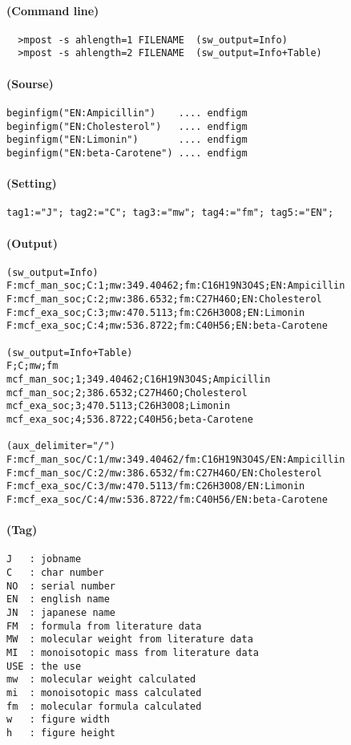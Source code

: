\documentclass[a4paper]{article}
\begin{document}
\paragraph{(Command line)}
\begin{verbatim}
  >mpost -s ahlength=1 FILENAME  (sw_output=Info)
  >mpost -s ahlength=2 FILENAME  (sw_output=Info+Table)
\end{verbatim}
\paragraph{(Sourse)}
\begin{verbatim}
beginfigm("EN:Ampicillin")    .... endfigm
beginfigm("EN:Cholesterol")   .... endfigm
beginfigm("EN:Limonin")       .... endfigm
beginfigm("EN:beta-Carotene") .... endfigm
\end{verbatim}
\paragraph{(Setting)}
\begin{verbatim}
tag1:="J"; tag2:="C"; tag3:="mw"; tag4:="fm"; tag5:="EN";
\end{verbatim}
\paragraph{(Output)}
%
\begin{verbatim}
(sw_output=Info)
F:mcf_man_soc;C:1;mw:349.40462;fm:C16H19N3O4S;EN:Ampicillin
F:mcf_man_soc;C:2;mw:386.6532;fm:C27H46O;EN:Cholesterol
F:mcf_exa_soc;C:3;mw:470.5113;fm:C26H30O8;EN:Limonin
F:mcf_exa_soc;C:4;mw:536.8722;fm:C40H56;EN:beta-Carotene

(sw_output=Info+Table)
F;C;mw;fm
mcf_man_soc;1;349.40462;C16H19N3O4S;Ampicillin
mcf_man_soc;2;386.6532;C27H46O;Cholesterol
mcf_exa_soc;3;470.5113;C26H30O8;Limonin
mcf_exa_soc;4;536.8722;C40H56;beta-Carotene

(aux_delimiter="/")
F:mcf_man_soc/C:1/mw:349.40462/fm:C16H19N3O4S/EN:Ampicillin
F:mcf_man_soc/C:2/mw:386.6532/fm:C27H46O/EN:Cholesterol
F:mcf_exa_soc/C:3/mw:470.5113/fm:C26H30O8/EN:Limonin
F:mcf_exa_soc/C:4/mw:536.8722/fm:C40H56/EN:beta-Carotene
\end{verbatim}
\paragraph{(Tag)}
\begin{verbatim}
J   : jobname                           
C   : char number
NO  : serial number
EN  : english name
JN  : japanese name
FM  : formula from literature data
MW  : molecular weight from literature data
MI  : monoisotopic mass from literature data
USE : the use
mw  : molecular weight calculated
mi  : monoisotopic mass calculated
fm  : molecular formula calculated
w   : figure width
h   : figure height
\end{verbatim}
\noindent%
\newpage
\end{document}
